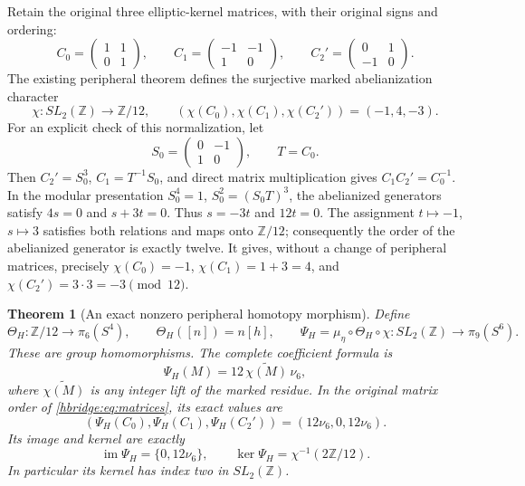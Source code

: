 \documentclass[11pt]{article}
\newtheorem{theorem}{Theorem}[section]
\theoremstyle{definition}
\begin{document}
Retain the original three elliptic-kernel matrices, with their
original signs and ordering:
\begin{equation}
C_0=\begin{pmatrix}1&1\\0&1\end{pmatrix},\qquad
C_1=\begin{pmatrix}-1&-1\\1&0\end{pmatrix},\qquad
C_2'=\begin{pmatrix}0&1\\-1&0\end{pmatrix}.
\label{hbridge:eq:matrices}
\end{equation}
The existing peripheral theorem \cite{hbridgebib:HBHigher} defines the
surjective marked abelianization character
\begin{equation}
\chi:SL_2(\mathbb Z)\longrightarrow\mathbb Z/12,
\qquad
(\chi(C_0),\chi(C_1),\chi(C_2'))=(-1,4,-3).
\label{hbridge:eq:chi}
\end{equation}
For an explicit check of this normalization, let
\[
S_0=\begin{pmatrix}0&-1\\1&0\end{pmatrix},\qquad T=C_0.
\]
Then \(C_2'=S_0^3\), \(C_1=T^{-1}S_0\), and direct matrix
multiplication gives \(C_1C_2'=C_0^{-1}\). In the modular
presentation \(S_0^4=1\), \(S_0^2=(S_0T)^3\), the
abelianized generators satisfy \(4s=0\) and \(s+3t=0\).
Thus \(s=-3t\) and \(12t=0\). The assignment
\(t\mapsto-1\), \(s\mapsto3\) satisfies both relations and
maps onto \(\mathbb Z/12\); consequently the order of the
abelianized generator is exactly twelve. It gives, without a
change of peripheral matrices, precisely
\(\chi(C_0)=-1\), \(\chi(C_1)=1+3=4\), and
\(\chi(C_2')=3\cdot3=-3\pmod{12}\).

\begin{theorem}[An exact nonzero peripheral homotopy morphism]
\label{hbridge:peripheral-theorem}
Define
\begin{equation}
\Theta_H:\mathbb Z/12\longrightarrow\pi_6(S^4),
\qquad \Theta_H([n])=n[h],
\qquad
\Psi_H=\mu_\eta\circ\Theta_H\circ\chi:
SL_2(\mathbb Z)\longrightarrow\pi_9(S^6).
\label{hbridge:eq:Psi}
\end{equation}
These are group homomorphisms. The complete coefficient formula is
\begin{equation}
\Psi_H(M)=12\,\widetilde{\chi(M)}\,\nu_6,
\label{hbridge:eq:coefficient}
\end{equation}
where \(\widetilde{\chi(M)}\) is any integer lift of the
marked residue. In the original matrix order of
\eqref{hbridge:eq:matrices}, its exact values are
\begin{equation}
(\Psi_H(C_0),\Psi_H(C_1),\Psi_H(C_2'))
=(12\nu_6,0,12\nu_6).
\label{hbridge:eq:values}
\end{equation}
Its image and kernel are exactly
\begin{equation}
\operatorname{im}\Psi_H=\{0,12\nu_6\},\qquad
\ker\Psi_H=\chi^{-1}(2\mathbb Z/12).
\label{hbridge:eq:kernel}
\end{equation}
In particular its kernel has index two in \(SL_2(\mathbb Z)\).
\end{theorem}
\end{document}
